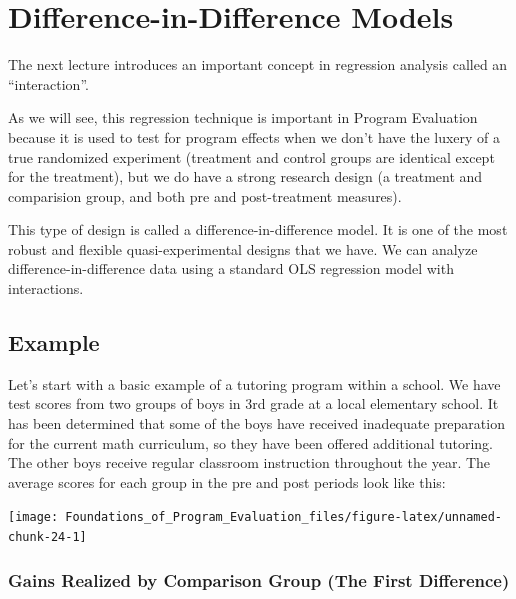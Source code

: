 \documentclass[]{book}
\theoremstyle{definition}
\theoremstyle{definition}
\theoremstyle{definition}
\theoremstyle{remark}
\begin{document}
\hypertarget{difference-in-difference-models}{%
\chapter{Difference-in-Difference
Models}\label{difference-in-difference-models}}

The next lecture introduces an important concept in regression analysis
called an ``interaction''.

As we will see, this regression technique is important in Program
Evaluation because it is used to test for program effects when we don't
have the luxery of a true randomized experiment (treatment and control
groups are identical except for the treatment), but we do have a strong
research design (a treatment and comparision group, and both pre and
post-treatment measures).

This type of design is called a difference-in-difference model. It is
one of the most robust and flexible quasi-experimental designs that we
have. We can analyze difference-in-difference data using a standard OLS
regression model with interactions.

\hypertarget{example}{%
\section{Example}\label{example}}

Let's start with a basic example of a tutoring program within a school.
We have test scores from two groups of boys in 3rd grade at a local
elementary school. It has been determined that some of the boys have
received inadequate preparation for the current math curriculum, so they
have been offered additional tutoring. The other boys receive regular
classroom instruction throughout the year. The average scores for each
group in the pre and post periods look like this:

\begin{center}\texttt{[image: Foundations\_of\_Program\_Evaluation\_files/figure-latex/unnamed-chunk-24-1]} \end{center}

\hypertarget{gains-realized-by-comparison-group-the-first-difference}{%
\subsection{Gains Realized by Comparison Group (The First
Difference)}\label{gains-realized-by-comparison-group-the-first-difference}}
\end{document}
